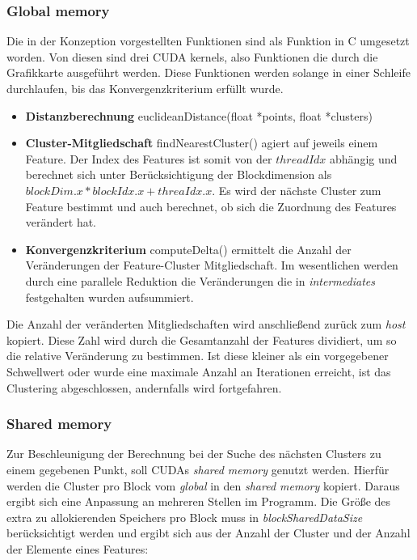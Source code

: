 \subsubsection{Global memory}

Die in der Konzeption vorgestellten Funktionen sind als Funktion in C umgesetzt worden. Von diesen sind drei CUDA kernels, also Funktionen die durch die Grafikkarte ausgeführt werden. Diese Funktionen werden solange in einer Schleife durchlaufen, bis das Konvergenzkriterium erfüllt wurde.

\begin{itemize}
	\item \textbf{Distanzberechnung} euclideanDistance(float *points, float *clusters)
	\item \textbf{Cluster-Mitgliedschaft} findNearestCluster() agiert auf jeweils einem Feature. Der Index des Features ist somit von der $threadIdx$ abhängig und berechnet sich unter Berücksichtigung der Blockdimension als $blockDim.x * blockIdx.x + threaIdx.x$. Es wird der nächste Cluster zum Feature bestimmt und auch berechnet, ob sich die Zuordnung des Features verändert hat. 
	\item \textbf{Konvergenzkriterium} computeDelta() ermittelt die Anzahl der Veränderungen der Feature-Cluster Mitgliedschaft. Im wesentlichen werden durch eine  parallele Reduktion die Veränderungen die in \textit{intermediates} festgehalten wurden aufsummiert.
\end{itemize}

Die Anzahl der veränderten Mitgliedschaften wird anschließend zurück zum \textit{host} kopiert. Diese Zahl wird durch die Gesamtanzahl der Features dividiert, um so die relative Veränderung zu bestimmen. Ist diese kleiner als ein vorgegebener Schwellwert oder wurde eine maximale Anzahl an Iterationen erreicht, ist das Clustering abgeschlossen, andernfalls wird fortgefahren.

\subsubsection{Shared memory}

Zur Beschleunigung der Berechnung bei der Suche des nächsten Clusters zu einem gegebenen Punkt, soll CUDAs \textit{shared memory} genutzt werden. Hierfür werden die Cluster pro Block vom \textit{global} in den \textit{shared memory} kopiert. Daraus ergibt sich eine Anpassung an mehreren Stellen im Programm. Die Größe des extra zu allokierenden Speichers pro Block muss in \textit{blockSharedDataSize} berücksichtigt werden und ergibt sich aus der Anzahl der Cluster und der Anzahl der Elemente eines Features:

